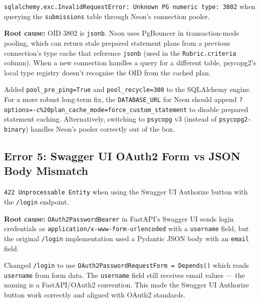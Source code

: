 \documentclass[12pt,a4paper]{article}
\begin{document}
\begin{errorbox}[Error]
\texttt{sqlalchemy.exc.InvalidRequestError: Unknown PG numeric type: 3802} when querying the \texttt{submissions} table through Neon's connection pooler.
\end{errorbox}

\textbf{Root cause:} OID 3802 is \texttt{jsonb}. Neon uses PgBouncer in transaction-mode pooling, which can return stale prepared statement plans from a previous connection's type cache that reference \texttt{jsonb} (used in the \texttt{Rubric.criteria} column). When a new connection handles a query for a different table, psycopg2's local type registry doesn't recognise the OID from the cached plan.

\begin{successbox}[Fix]
Added \texttt{pool\_pre\_ping=True} and \texttt{pool\_recycle=300} to the SQLAlchemy engine. For a more robust long-term fix, the \texttt{DATABASE\_URL} for Neon should append \texttt{?options=-c\%20plan\_cache\_mode=force\_custom\_statement} to disable prepared statement caching. Alternatively, switching to \texttt{psycopg} v3 (instead of \texttt{psycopg2-binary}) handles Neon's pooler correctly out of the box.
\end{successbox}

\subsection{Error 5: Swagger UI OAuth2 Form vs JSON Body Mismatch}

\begin{errorbox}[Error]
\texttt{422 Unprocessable Entity} when using the Swagger UI Authorize button with the \texttt{/login} endpoint.
\end{errorbox}

\textbf{Root cause:} \texttt{OAuth2PasswordBearer} in FastAPI's Swagger UI sends login credentials as \texttt{application/x-www-form-urlencoded} with a \texttt{username} field, but the original \texttt{/login} implementation used a Pydantic JSON body with an \texttt{email} field.

\begin{successbox}[Fix]
Changed \texttt{/login} to use \texttt{OAuth2PasswordRequestForm = Depends()} which reads \texttt{username} from form data. The \texttt{username} field still receives email values — the naming is a FastAPI/OAuth2 convention. This made the Swagger UI Authorize button work correctly and aligned with OAuth2 standards.
\end{successbox}
\end{document}
